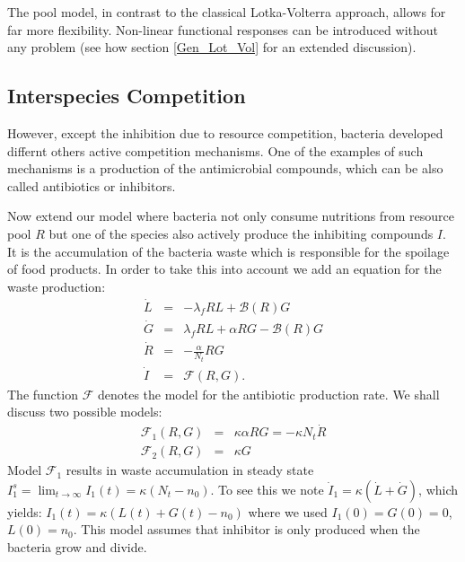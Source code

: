 \documentclass[10pt,A4paper]{article}
\begin{document}
The pool model, in contrast to the classical Lotka-Volterra approach, allows for far more flexibility. 
Non-linear functional responses can be introduced without any problem (see how section \ref{Gen_Lot_Vol} for an extended discussion).



\subsection{Interspecies Competition}

However, except the inhibition due to resource competition, bacteria developed differnt others active competition mechanisms.
One of the examples of such mechanisms is a production of the antimicrobial compounds, which can be also called antibiotics or inhibitors.



Now extend our model where bacteria not only consume nutritions from resource pool $R$ but one of the species also actively produce the inhibiting compounds $I$. 
It is the accumulation of the bacteria waste which is responsible for the spoilage of food products. 
In order to take this into account we add an equation for the waste production:
\begin{eqnarray}
\dot{L} &=& - \lambda_f R L + \mathcal{B}(R)G\\
\dot{G} &=& \lambda_f R L +\alpha R G-\mathcal{B}(R)G\\
\dot{R} &=&-\frac{\alpha}{N_t} R G\\
\dot{I} &=& \mathcal{F}(R,G).
\end{eqnarray}
The function $\mathcal{F}$ denotes the model for the antibiotic production rate. 
We shall discuss two possible models:
\begin{eqnarray}
\mathcal{F}_1(R,G)&=&\kappa\alpha R G=-\kappa N_t\dot{R}\\
\mathcal{F}_2(R,G)&=&\kappa G
\end{eqnarray}
Model $\mathcal{F}_1$ results in waste accumulation in steady state $I_1^s=\lim_{t\to\infty}I_1(t)=\kappa(N_t-n_0)$. 
To see this we note $\dot{I}_1=\kappa(\dot{L}+\dot{G})$, which yields: $I_1(t)=\kappa(L(t)+G(t)-n_0)$ where we used $I_1(0)=G(0)=0$, $L(0)=n_0$. 
This model assumes that inhibitor is only produced when the bacteria grow and divide. \\
\end{document}
